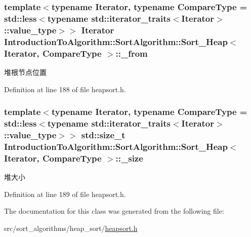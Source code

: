 \subsubsection[{\+\_\+from}]{\setlength{\rightskip}{0pt plus 5cm}template$<$typename Iterator, typename Compare\+Type = std\+::less$<$typename std\+::iterator\+\_\+traits$<$\+Iterator$>$\+::value\+\_\+type$>$$>$ Iterator {\bf Introduction\+To\+Algorithm\+::\+Sort\+Algorithm\+::\+Sort\+\_\+\+Heap}$<$ Iterator, Compare\+Type $>$\+::\+\_\+from\hspace{0.3cm}{\ttfamily [private]}}\label{class_introduction_to_algorithm_1_1_sort_algorithm_1_1_sort___heap_a484d28581bfe39a387d90852e38ac36c}
堆根节点位置 

Definition at line 188 of file heapsort.\+h.

\hypertarget{class_introduction_to_algorithm_1_1_sort_algorithm_1_1_sort___heap_a57a42830d3b52d60d2ec1dfd11e2bda6}{}
\subsubsection[{\+\_\+size}]{\setlength{\rightskip}{0pt plus 5cm}template$<$typename Iterator, typename Compare\+Type = std\+::less$<$typename std\+::iterator\+\_\+traits$<$\+Iterator$>$\+::value\+\_\+type$>$$>$ std\+::size\+\_\+t {\bf Introduction\+To\+Algorithm\+::\+Sort\+Algorithm\+::\+Sort\+\_\+\+Heap}$<$ Iterator, Compare\+Type $>$\+::\+\_\+size\hspace{0.3cm}{\ttfamily [private]}}\label{class_introduction_to_algorithm_1_1_sort_algorithm_1_1_sort___heap_a57a42830d3b52d60d2ec1dfd11e2bda6}
堆大小 

Definition at line 189 of file heapsort.\+h.



The documentation for this class was generated from the following file\+:\begin{DoxyCompactItemize}
\item 
src/sort\+\_\+algorithms/heap\+\_\+sort/\hyperlink{heapsort_8h}{heapsort.\+h}\end{DoxyCompactItemize}
